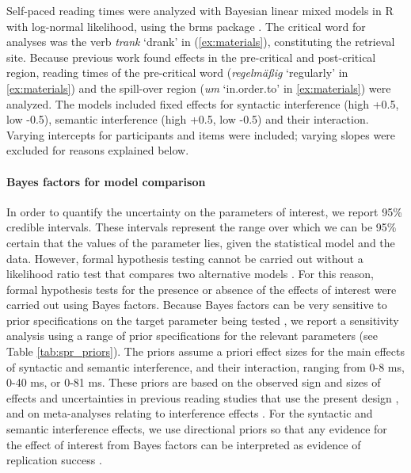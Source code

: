 \documentclass[a4paper, man, floatsintext]{apa7}
\begin{document}
Self-paced reading times were analyzed with Bayesian linear mixed models in R \citep{r} with log-normal likelihood, using the brms package \citep{brms}. The critical word for analyses was the verb \textit{trank} `drank' in (\ref{ex:materials}), constituting the retrieval site. Because previous work found effects in the pre-critical and post-critical region, reading times of the pre-critical word (\textit{regelmäßig} `regularly' in \ref{ex:materials}) and the spill-over region (\textit{um} `in.order.to' in \ref{ex:materials}) were analyzed. 
The models included fixed effects for syntactic interference (high +0.5, low -0.5), semantic interference (high +0.5, low -0.5) and their interaction.  Varying intercepts for participants and items were included; varying slopes were excluded for reasons explained below.  

\paragraph{Bayes factors for model comparison}

In order to quantify the uncertainty on the parameters of interest, we report 95\% credible intervals.  
These intervals represent the range over which we can be 95\% certain that the values of the parameter lies, given the statistical model and the data. However, formal hypothesis testing cannot be carried out without a likelihood ratio test that compares two alternative models \parencite{schad_etal_2022_BF,Royall}. For this reason, formal hypothesis tests for the presence or absence of the effects of interest were carried out using Bayes factors. Because Bayes factors can be very sensitive to prior specifications on the target parameter being tested \parencite{schad_etal_2022_BF}, 
we report a sensitivity analysis using a range of prior specifications for the relevant parameters (see Table \ref{tab:spr_priors}). The priors assume a priori effect sizes for the main effects of syntactic and semantic interference, and their interaction, ranging from 0-8 ms, 0-40 ms, or 0-81 ms.  These priors are based on the observed sign and sizes of effects and uncertainties in previous reading studies that use the present design \parencite{vandyke07,mertzen}, and on meta-analyses relating to interference effects  \parencite{jaeger_etal_2017}. For the syntactic and semantic interference effects, we use directional priors so that any evidence for the effect of interest from Bayes factors can be interpreted as evidence of replication success \parencite{verhagen2014bayesian}.
\end{document}
